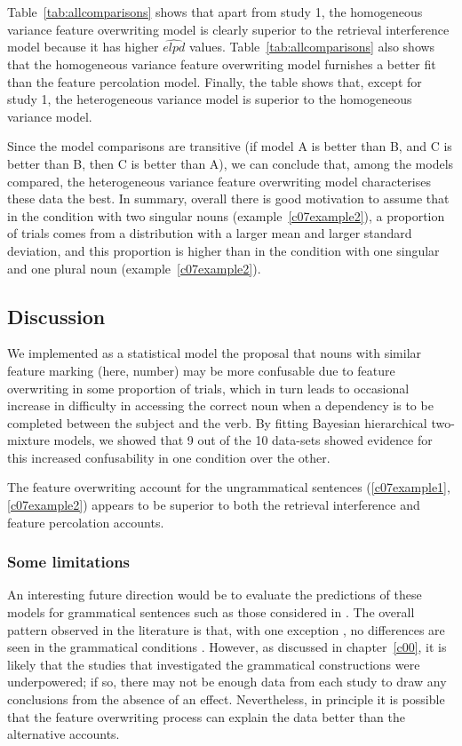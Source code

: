 \documentclass{cambridge7A}\usepackage[]{graphicx}\usepackage[]{color}
\begin{document}
Table~\ref{tab:allcomparisons}  shows that 
apart from study 1, the homogeneous variance feature overwriting model is clearly superior to the retrieval interference model because it has higher $\widehat{elpd}$ values. 
Table~\ref{tab:allcomparisons} also shows that the homogeneous variance feature overwriting model furnishes a better fit than the  feature percolation model. Finally, the table shows that, except for study 1, the  heterogeneous variance model is superior to the  homogeneous variance model.

Since the model comparisons are transitive (if model A is better than B, and C is better than B, then C is better than A), we can conclude that, among the models compared, the heterogeneous variance feature overwriting model characterises these data the best. 
In summary, overall there is good motivation to assume that in the
condition with two singular nouns (example~\ref{c07example2}), a proportion of trials comes from a distribution with a larger mean and larger standard deviation, and this proportion is higher than in the condition with one singular and one plural noun (example~\ref{c07example2}). 

\subsection{Discussion}

We implemented as a statistical model the proposal that nouns with similar feature marking (here, number) may be more confusable due to feature overwriting in some proportion of trials, which in turn leads to occasional increase in difficulty in accessing the correct noun when a dependency is to be completed between the subject and the verb. By fitting Bayesian hierarchical two-mixture models, we showed that 9 out of the 10 data-sets showed evidence for this increased confusability in one condition over the other. 

The feature overwriting account for the ungrammatical sentences (\ref{c07example1}, \ref{c07example2}) appears to be superior to both the retrieval interference and feature percolation accounts. 

\subsubsection{Some limitations}

An interesting future direction would be to evaluate the predictions of these models for grammatical sentences such as those considered in \cite{VillataFranck}. The overall pattern observed in the literature is that, with one exception \citep{nicenboimexploratory}, no differences are seen in the grammatical conditions \citep[see, e.g., the meta-analysis results reported in][]{JaegerEngelmannVasishth2017}. However, as discussed in chapter~\ref{c00}, it is likely that the studies that investigated the grammatical constructions were underpowered; if so, there may not be enough data from each study to draw any conclusions from the absence of an effect. Nevertheless, in principle it is possible that the feature overwriting process can explain the data better than the alternative accounts. 
\end{document}
